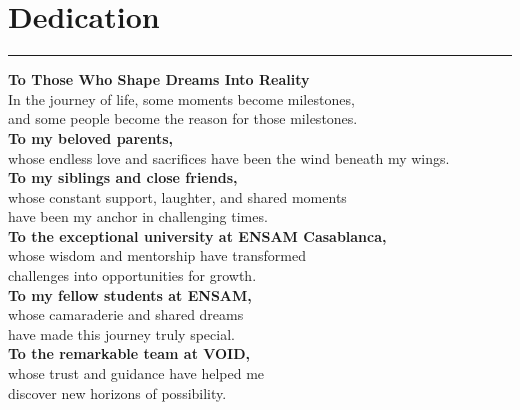 \chapter*{Dedication}
\thispagestyle{empty}

\begin{center}
  \begin{minipage}{0.4\textwidth}
  \centering
  \rule{\textwidth}{0.4pt}
  \end{minipage}
  
  \vspace{0.5em}
  \begin{center}
    \centering
    \fontsize{14}{18}\selectfont\itshape
    
    \begin{minipage}{0.85\textwidth}
    \textbf{\large To Those Who Shape Dreams Into Reality}\\[0.6em]
    \centering
    In the journey of life, some moments become milestones,\\
    and some people become the reason for those milestones.\\[0.6em]
    
    \textbf{To my beloved parents,}\\
    whose endless love and sacrifices have been the wind beneath my wings.\\[0.6em]
    
    \textbf{To my siblings and close friends,}\\
    whose constant support, laughter, and shared moments\\
    have been my anchor in challenging times.\\[0.6em]
    
    \textbf{To the exceptional university at ENSAM Casablanca,}\\
    whose wisdom and mentorship have transformed\\
    challenges into opportunities for growth.\\[0.6em]
    
    \textbf{To my fellow students at ENSAM,}\\
    whose camaraderie and shared dreams\\
    have made this journey truly special.\\[0.6em]
    
    \textbf{To the remarkable team at VOID,}\\
    whose trust and guidance have helped me\\
    discover new horizons of possibility.\\[0.6em]
    

\end{minipage}
\end{center}
\end{center}
